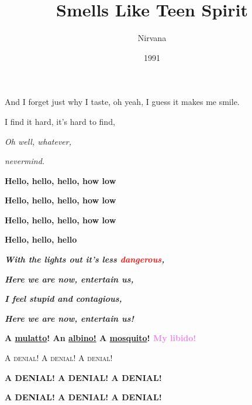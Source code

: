 \documentclass[10pt, letterpaper]{article}
\title{Smells Like Teen Spirit}
\author{Nirvana}
\date{1991}
\begin{document}
\maketitle
And I forget just why I taste, oh yeah, I guess it makes me smile. \par
I find it hard, it's hard to find, \par

\textit{Oh well, whatever,} \raggedleft  \par
\textit{nevermind.} \raggedleft  \par
\RaggedRight
\vspace{1em}

\textbf{Hello, hello, hello, how low} \par
\textbf{Hello, hello, hello, how low} \par
\textbf{Hello, hello, hello, how low} \par
\textbf{Hello, hello, hello} \par
\vspace{3em}

\textbf{\textit{With the lights out it's less \textcolor{red}{dangerous},}} \par
\textbf{\textit{Here we are now, entertain us,}} \par
\textbf{\textit{\textcolor{red!60!black}{I feel stupid and contagious,}}} \par
\textbf{\textit{Here we are now, entertain us!}} \par
\vspace{1em}

\setlength{\parindent}{8em}
\textbf{A \textcolor{brown!40!black!90!}{\underline{mulatto}}! An \textcolor{black!30}{\underline{albino!}} A \underline{mosquito}! \textcolor{violet}{My libido!}} \par
\vspace{4em}

\setlength{\parindent}{8em}
\large{A} 
\textsc{denial!}
\large{A} 
\textsc{denial!} 
\large{A} 
\textsc{denial!} \par
\vspace{1em}

\setlength{\parindent}{3em}
\textbf{
\Large{A}
\large{DENIAL}\Large{! A}
\large{DENIAL}\Large{! A}
\large{DENIAL}\Large{!}} \par
\vspace{1em}

\setlength{\parindent}{1em}
\textbf{
\Huge{A}
\Large{DENIAL}\Huge{! A}
\Large{DENIAL}\Huge{! A}
\Large{DENIAL}\Huge{!}}
\end{document}
